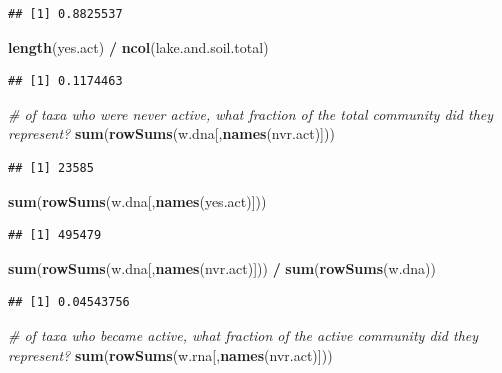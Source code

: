 \documentclass[]{article}
\newenvironment{Shaded}{\begin{snugshade}}{\end{snugshade}}
\newcommand{\CommentTok}[1]{\textcolor[rgb]{0.56,0.35,0.01}{\textit{#1}}}
\newcommand{\KeywordTok}[1]{\textcolor[rgb]{0.13,0.29,0.53}{\textbf{#1}}}
\newcommand{\NormalTok}[1]{#1}
\newcommand{\OperatorTok}[1]{\textcolor[rgb]{0.81,0.36,0.00}{\textbf{#1}}}
\newcommand{\StringTok}[1]{\textcolor[rgb]{0.31,0.60,0.02}{#1}}
\begin{document}
\begin{verbatim}
## [1] 0.8825537
\end{verbatim}

\begin{Shaded}
\begin{Highlighting}[]
\KeywordTok{length}\NormalTok{(yes.act) }\OperatorTok{/}\StringTok{ }\KeywordTok{ncol}\NormalTok{(lake.and.soil.total)}
\end{Highlighting}
\end{Shaded}

\begin{verbatim}
## [1] 0.1174463
\end{verbatim}

\begin{Shaded}
\begin{Highlighting}[]
\CommentTok{# of taxa who were never active, what fraction of the total community did they represent?}
\KeywordTok{sum}\NormalTok{(}\KeywordTok{rowSums}\NormalTok{(w.dna[,}\KeywordTok{names}\NormalTok{(nvr.act)]))}
\end{Highlighting}
\end{Shaded}

\begin{verbatim}
## [1] 23585
\end{verbatim}

\begin{Shaded}
\begin{Highlighting}[]
\KeywordTok{sum}\NormalTok{(}\KeywordTok{rowSums}\NormalTok{(w.dna[,}\KeywordTok{names}\NormalTok{(yes.act)]))}
\end{Highlighting}
\end{Shaded}

\begin{verbatim}
## [1] 495479
\end{verbatim}

\begin{Shaded}
\begin{Highlighting}[]
\KeywordTok{sum}\NormalTok{(}\KeywordTok{rowSums}\NormalTok{(w.dna[,}\KeywordTok{names}\NormalTok{(nvr.act)])) }\OperatorTok{/}\StringTok{ }\KeywordTok{sum}\NormalTok{(}\KeywordTok{rowSums}\NormalTok{(w.dna))}
\end{Highlighting}
\end{Shaded}

\begin{verbatim}
## [1] 0.04543756
\end{verbatim}

\begin{Shaded}
\begin{Highlighting}[]
\CommentTok{# of taxa who became active, what fraction of the active community did they represent?}
\KeywordTok{sum}\NormalTok{(}\KeywordTok{rowSums}\NormalTok{(w.rna[,}\KeywordTok{names}\NormalTok{(nvr.act)]))}
\end{Highlighting}
\end{Shaded}
\end{document}
